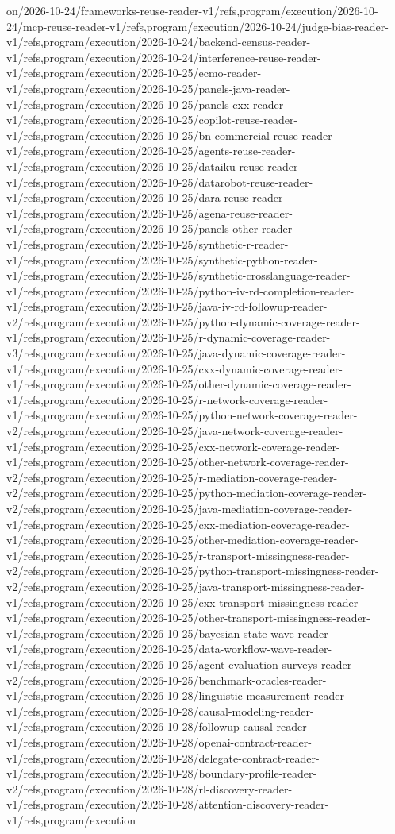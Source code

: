 \documentclass[11pt,a4paper,openany]{book}
\begin{document}
on/2026-10-24/frameworks-reuse-reader-v1/refs,program/execution/2026-10-24/mcp-reuse-reader-v1/refs,program/execution/2026-10-24/judge-bias-reader-v1/refs,program/execution/2026-10-24/backend-census-reader-v1/refs,program/execution/2026-10-24/interference-reuse-reader-v1/refs,program/execution/2026-10-25/ecmo-reader-v1/refs,program/execution/2026-10-25/panels-java-reader-v1/refs,program/execution/2026-10-25/panels-cxx-reader-v1/refs,program/execution/2026-10-25/copilot-reuse-reader-v1/refs,program/execution/2026-10-25/bn-commercial-reuse-reader-v1/refs,program/execution/2026-10-25/agents-reuse-reader-v1/refs,program/execution/2026-10-25/dataiku-reuse-reader-v1/refs,program/execution/2026-10-25/datarobot-reuse-reader-v1/refs,program/execution/2026-10-25/dara-reuse-reader-v1/refs,program/execution/2026-10-25/agena-reuse-reader-v1/refs,program/execution/2026-10-25/panels-other-reader-v1/refs,program/execution/2026-10-25/synthetic-r-reader-v1/refs,program/execution/2026-10-25/synthetic-python-reader-v1/refs,program/execution/2026-10-25/synthetic-crosslanguage-reader-v1/refs,program/execution/2026-10-25/python-iv-rd-completion-reader-v1/refs,program/execution/2026-10-25/java-iv-rd-followup-reader-v2/refs,program/execution/2026-10-25/python-dynamic-coverage-reader-v1/refs,program/execution/2026-10-25/r-dynamic-coverage-reader-v3/refs,program/execution/2026-10-25/java-dynamic-coverage-reader-v1/refs,program/execution/2026-10-25/cxx-dynamic-coverage-reader-v1/refs,program/execution/2026-10-25/other-dynamic-coverage-reader-v1/refs,program/execution/2026-10-25/r-network-coverage-reader-v1/refs,program/execution/2026-10-25/python-network-coverage-reader-v2/refs,program/execution/2026-10-25/java-network-coverage-reader-v1/refs,program/execution/2026-10-25/cxx-network-coverage-reader-v1/refs,program/execution/2026-10-25/other-network-coverage-reader-v2/refs,program/execution/2026-10-25/r-mediation-coverage-reader-v2/refs,program/execution/2026-10-25/python-mediation-coverage-reader-v2/refs,program/execution/2026-10-25/java-mediation-coverage-reader-v1/refs,program/execution/2026-10-25/cxx-mediation-coverage-reader-v1/refs,program/execution/2026-10-25/other-mediation-coverage-reader-v1/refs,program/execution/2026-10-25/r-transport-missingness-reader-v2/refs,program/execution/2026-10-25/python-transport-missingness-reader-v2/refs,program/execution/2026-10-25/java-transport-missingness-reader-v1/refs,program/execution/2026-10-25/cxx-transport-missingness-reader-v1/refs,program/execution/2026-10-25/other-transport-missingness-reader-v1/refs,program/execution/2026-10-25/bayesian-state-wave-reader-v1/refs,program/execution/2026-10-25/data-workflow-wave-reader-v1/refs,program/execution/2026-10-25/agent-evaluation-surveys-reader-v2/refs,program/execution/2026-10-25/benchmark-oracles-reader-v1/refs,program/execution/2026-10-28/linguistic-measurement-reader-v1/refs,program/execution/2026-10-28/causal-modeling-reader-v1/refs,program/execution/2026-10-28/followup-causal-reader-v1/refs,program/execution/2026-10-28/openai-contract-reader-v1/refs,program/execution/2026-10-28/delegate-contract-reader-v1/refs,program/execution/2026-10-28/boundary-profile-reader-v2/refs,program/execution/2026-10-28/rl-discovery-reader-v1/refs,program/execution/2026-10-28/attention-discovery-reader-v1/refs,program/execution
\end{document}
